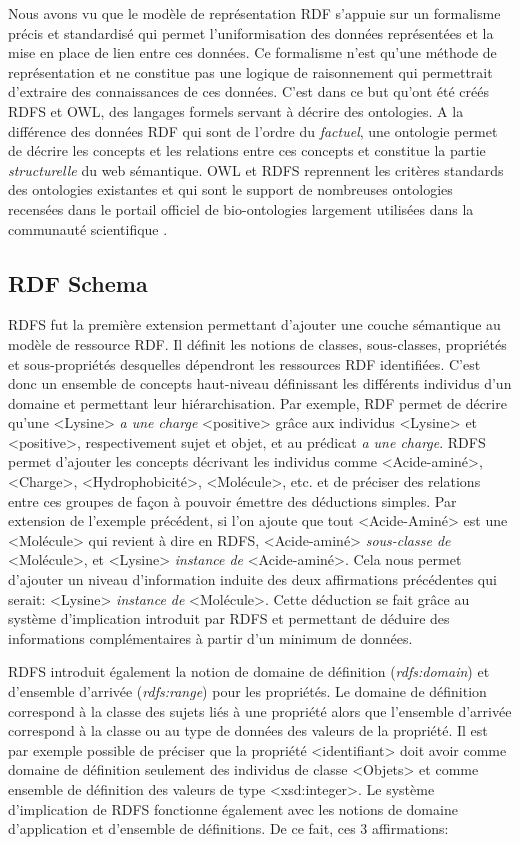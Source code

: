 Nous avons vu que le modèle de représentation RDF s'appuie sur un formalisme précis et standardisé qui permet l'uniformisation des données représentées et la mise en place de lien entre ces données. Ce formalisme n'est qu'une méthode de représentation et ne constitue pas une logique de raisonnement qui permettrait d'extraire des connaissances de ces données. C'est dans ce but qu'ont été créés RDFS et OWL, des langages formels servant à décrire des ontologies. A la différence des données RDF qui sont de l'ordre du \textit{factuel}, une ontologie permet de décrire les concepts et les relations entre ces concepts et constitue la partie \textit{structurelle} du web sémantique.
OWL et RDFS reprennent les critères standards des ontologies existantes et qui sont le support de nombreuses ontologies recensées dans le portail officiel de bio-ontologies largement utilisées dans la communauté scientifique \cite{smith_obo_2007}.

\subsection{RDF Schema} \label{rdfs}

RDFS fut la première extension permettant d'ajouter une couche sémantique au modèle de ressource RDF. Il définit les notions de classes, sous-classes, propriétés et sous-propriétés desquelles dépendront les ressources RDF identifiées. C'est donc un ensemble de concepts haut-niveau définissant les différents individus d'un domaine et permettant leur hiérarchisation. 
Par exemple, RDF permet de décrire qu'une <Lysine> \textit{a une charge} <positive> grâce aux individus <Lysine> et <positive>, respectivement sujet et objet, et au prédicat \textit{a une charge}. RDFS permet d'ajouter les concepts décrivant les individus comme <Acide-aminé>, <Charge>, <Hydrophobicité>, <Molécule>, etc. et de préciser des relations entre ces groupes de façon à pouvoir émettre des déductions simples. Par extension de l'exemple précédent, si l'on ajoute que tout <Acide-Aminé> est une <Molécule> qui revient à dire en RDFS, <Acide-aminé> \textit{sous-classe de} <Molécule>, et <Lysine> \textit{instance de} <Acide-aminé>. Cela nous permet d'ajouter un niveau d'information induite des deux affirmations précédentes qui serait: <Lysine> \textit{instance de} <Molécule>. Cette déduction se fait grâce au système d'implication introduit par RDFS et permettant de déduire des informations complémentaires à partir d'un minimum de données.

RDFS introduit également la notion de domaine de définition (\textit{rdfs:domain}) et d'ensemble d'arrivée (\textit{rdfs:range}) pour les propriétés. Le domaine de définition correspond à la classe des sujets liés à une propriété alors que l'ensemble d'arrivée correspond à la classe ou au type de données des valeurs de la propriété. Il est par exemple possible de préciser que la propriété <identifiant> doit avoir comme domaine de définition seulement des individus de classe <Objets> et comme ensemble de définition des valeurs de type <xsd:integer>.
Le système d'implication de RDFS fonctionne également avec les notions de domaine d'application et d'ensemble de définitions. De ce fait, ces 3 affirmations:

